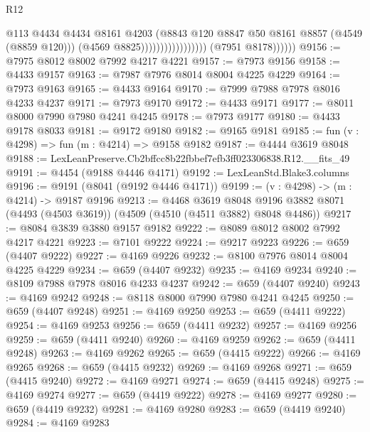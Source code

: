 \begin{lexlean}{R12}
\begin{coremodule}
                                              @113
                                              @4434
                                              @4434
                                              @8161
                                              @4203
                                              (@8843
                                                @120
                                                @8847
                                                @50
                                                @8161
                                                @8857
                                                (@4549 (@8859 @120)))
                                              (@4569 @8825)))))))))))))))))
              (@7951 @8178))))))
@9156 := @7975 @8012 @8002 @7992 @4217 @4221
@9157 := @7973 @9156
@9158 := @4433 @9157
@9163 := @7987 @7976 @8014 @8004 @4225 @4229
@9164 := @7973 @9163
@9165 := @4433 @9164
@9170 := @7999 @7988 @7978 @8016 @4233 @4237
@9171 := @7973 @9170
@9172 := @4433 @9171
@9177 := @8011 @8000 @7990 @7980 @4241 @4245
@9178 := @7973 @9177
@9180 := @4433 @9178 @8033
@9181 := @9172 @9180
@9182 := @9165 @9181
@9185 := fun (v : @4298) => fun (m : @4214) => @9158 @9182
@9187 := @4444 @3619 @8048
@9188 := LexLeanPreserve.Cb2bffcc8b22fbbef7efb3ff023306838.R12.__fits_49
@9191 := @4454 (@9188 @4446 @4171)
@9192 := LexLeanStd.Blake3.columns
@9196 := @9191 (@8041 (@9192 @4446 @4171))
@9199 := (v : @4298) -> (m : @4214) -> @9187 @9196
@9213 := @4468
    @3619
    @8048
    @9196
    @3882
    @8071
    (@4493 (@4503 @3619))
    (@4509 (@4510 (@4511 @3882) @8048 @4486))
@9217 := @8084 @3839 @3880 @9157 @9182
@9222 := @8089 @8012 @8002 @7992 @4217 @4221
@9223 := @7101 @9222
@9224 := @9217 @9223
@9226 := @659 (@4407 @9222)
@9227 := @4169 @9226
@9232 := @8100 @7976 @8014 @8004 @4225 @4229
@9234 := @659 (@4407 @9232)
@9235 := @4169 @9234
@9240 := @8109 @7988 @7978 @8016 @4233 @4237
@9242 := @659 (@4407 @9240)
@9243 := @4169 @9242
@9248 := @8118 @8000 @7990 @7980 @4241 @4245
@9250 := @659 (@4407 @9248)
@9251 := @4169 @9250
@9253 := @659 (@4411 @9222)
@9254 := @4169 @9253
@9256 := @659 (@4411 @9232)
@9257 := @4169 @9256
@9259 := @659 (@4411 @9240)
@9260 := @4169 @9259
@9262 := @659 (@4411 @9248)
@9263 := @4169 @9262
@9265 := @659 (@4415 @9222)
@9266 := @4169 @9265
@9268 := @659 (@4415 @9232)
@9269 := @4169 @9268
@9271 := @659 (@4415 @9240)
@9272 := @4169 @9271
@9274 := @659 (@4415 @9248)
@9275 := @4169 @9274
@9277 := @659 (@4419 @9222)
@9278 := @4169 @9277
@9280 := @659 (@4419 @9232)
@9281 := @4169 @9280
@9283 := @659 (@4419 @9240)
@9284 := @4169 @9283

\end{coremodule}
\end{lexlean}
